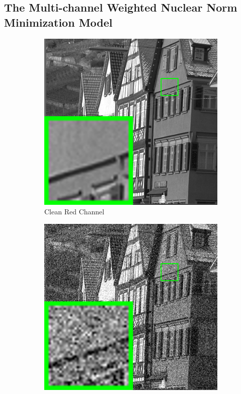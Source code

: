 \subsection{The Multi-channel Weighted Nuclear Norm Minimization Model}

\begin{figure}
    \centering
    \begin{subfigure}[t]{0.24\textwidth}
        \centering
        \includegraphics[width=1\textwidth]{images/mcwnnm/br_kodim08_1.png}
		\caption{Clean Red Channel}
    \end{subfigure}
    \hfill
    \begin{subfigure}[t]{0.24\textwidth}
        \centering
        \includegraphics[width=1\textwidth]{images/mcwnnm/br_Noisy_nSig402030_kodim08_1.png}

\end{subfigure}
\end{figure}
